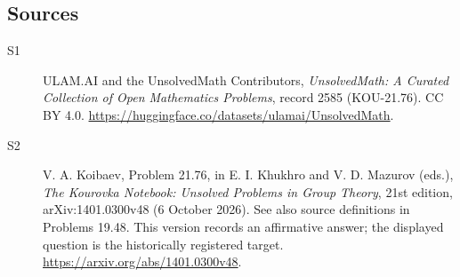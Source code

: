 \documentclass[11pt]{article}
\begin{document}
\subsection{Sources}
\begin{description}
\item[\hypertarget{source:2585:1}{S1}] ULAM.AI and the UnsolvedMath Contributors, \emph{UnsolvedMath: A Curated Collection of Open Mathematics Problems}, record 2585 (KOU-21.76). CC BY 4.0. \url{https://huggingface.co/datasets/ulamai/UnsolvedMath}.
\item[\hypertarget{source:2585:2}{S2}] V. A. Koibaev, Problem 21.76, in E. I. Khukhro and V. D. Mazurov (eds.), \emph{The Kourovka Notebook: Unsolved Problems in Group Theory}, 21st edition, arXiv:1401.0300v48 (6 October 2026). See also source definitions in Problems 19.48. This version records an affirmative answer; the displayed question is the historically registered target. \url{https://arxiv.org/abs/1401.0300v48}.
\end{description}
\label{end:2585}
\end{document}
